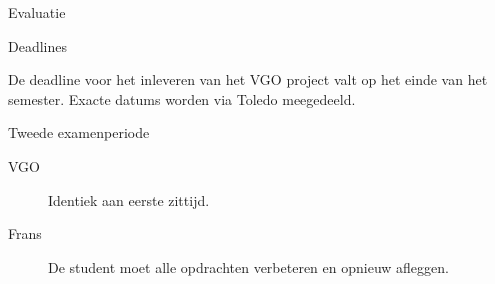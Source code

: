 \documentclass{studiewijzer}
\begin{document}
\begin{categorybox}{Evaluatie}
    \begin{category}{Deadlines}
        \begin{items}
            \item De deadline voor het inleveren van het VGO project valt op het einde van het semester.
                  Exacte datums worden via Toledo meegedeeld.
        \end{items}
    \end{category}

    \begin{category}{Tweede examenperiode}
        \begin{description}
            \item[VGO] Identiek aan eerste zittijd.
            \item[Frans] De student moet alle opdrachten verbeteren en opnieuw afleggen.
        \end{description}
    \end{category}
\end{categorybox}
\end{document}
